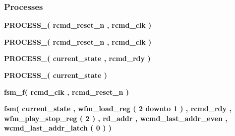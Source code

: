 \subsubsection*{Processes}
 \begin{DoxyCompactItemize}
\item 
{\bf P\+R\+O\+C\+E\+S\+S\+\_}{\bfseries  ( {\bfseries {\bfseries {\bf rcmd\+\_\+reset\+\_\+n}} \textcolor{vhdlchar}{ }} , {\bfseries {\bfseries {\bf rcmd\+\_\+clk}} \textcolor{vhdlchar}{ }} )}
\item 
{\bf P\+R\+O\+C\+E\+S\+S\+\_}{\bfseries  ( {\bfseries {\bfseries {\bf rcmd\+\_\+reset\+\_\+n}} \textcolor{vhdlchar}{ }} , {\bfseries {\bfseries {\bf rcmd\+\_\+clk}} \textcolor{vhdlchar}{ }} )}
\item 
{\bf P\+R\+O\+C\+E\+S\+S\+\_}{\bfseries  ( {\bfseries {\bfseries {\bf current\+\_\+state}} \textcolor{vhdlchar}{ }} , {\bfseries {\bfseries {\bf rcmd\+\_\+rdy}} \textcolor{vhdlchar}{ }} )}
\item 
{\bf P\+R\+O\+C\+E\+S\+S\+\_}{\bfseries  ( {\bfseries {\bfseries {\bf current\+\_\+state}} \textcolor{vhdlchar}{ }} )}
\item 
{\bf fsm\+\_\+f}{\bfseries  ( {\bfseries {\bfseries {\bf rcmd\+\_\+clk}} \textcolor{vhdlchar}{ }} , {\bfseries {\bfseries {\bf rcmd\+\_\+reset\+\_\+n}} \textcolor{vhdlchar}{ }} )}
\item 
{\bf fsm}{\bfseries  ( {\bfseries {\bfseries {\bf current\+\_\+state}} \textcolor{vhdlchar}{ }} , {\bfseries {\bfseries {\bf wfm\+\_\+load\+\_\+reg}} \textcolor{vhdlchar}{(}\textcolor{vhdlchar}{ } \textcolor{vhdldigit}{2} \textcolor{vhdlchar}{ }\textcolor{keywordflow}{downto}\textcolor{vhdlchar}{ }\textcolor{vhdlchar}{ } \textcolor{vhdldigit}{1} \textcolor{vhdlchar}{)}\textcolor{vhdlchar}{ }} , {\bfseries {\bfseries {\bf rcmd\+\_\+rdy}} \textcolor{vhdlchar}{ }} , {\bfseries {\bfseries {\bf wfm\+\_\+play\+\_\+stop\+\_\+reg}} \textcolor{vhdlchar}{(}\textcolor{vhdlchar}{ } \textcolor{vhdldigit}{2} \textcolor{vhdlchar}{)}\textcolor{vhdlchar}{ }} , {\bfseries {\bfseries {\bf rd\+\_\+addr}} \textcolor{vhdlchar}{ }} , {\bfseries {\bfseries {\bf wcmd\+\_\+last\+\_\+addr\+\_\+even}} \textcolor{vhdlchar}{ }} , {\bfseries {\bfseries {\bf wcmd\+\_\+last\+\_\+addr\+\_\+latch}} \textcolor{vhdlchar}{(}\textcolor{vhdlchar}{ } \textcolor{vhdldigit}{0} \textcolor{vhdlchar}{)}\textcolor{vhdlchar}{ }} )}
\end{DoxyCompactItemize}
